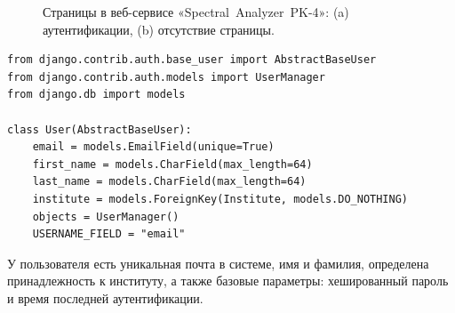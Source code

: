 \begin{figure}[t]
    \begin{center}
         \hspace{0.05\columnwidth}
         \caption{Страницы в веб-сервисе «Spectral~Analyzer~PK-4»: \pt(a) аутентификации, \pt(b) отсутствие страницы.}
         \label{fig:auth_and_page_not_found}
    \end{center}
\end{figure}

\begin{lstlisting}[style=py]
from django.contrib.auth.base_user import AbstractBaseUser
from django.contrib.auth.models import UserManager
from django.db import models

class User(AbstractBaseUser):
    email = models.EmailField(unique=True)
    first_name = models.CharField(max_length=64)
    last_name = models.CharField(max_length=64)
    institute = models.ForeignKey(Institute, models.DO_NOTHING)
    objects = UserManager()
    USERNAME_FIELD = "email"
\end{lstlisting}
У пользователя есть уникальная почта в системе, имя и фамилия, определена принадлежность к институту,
а также базовые параметры: хешированный пароль и время последней аутентификации.

